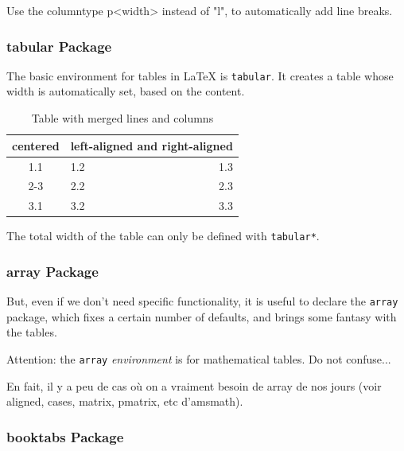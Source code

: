 \documentclass{boostreport}
\begin{document}
Use the columntype p{<width>} instead of "l", to automatically add line
breaks.

\subsubsection{tabular Package}
\label{sec:tabular-package}

The basic environment for tables in \LaTeX{} is \texttt{tabular}. It creates
a table whose width is automatically set, based on the content.

\begin{table}[!ht]
    \centering
    \begin{tabular}{| c | p{2cm} | r |}
        \hline
        centered     & \multicolumn{2}{c|}{left-aligned and right-aligned} \\
        \hline
        1.1          & 1.2                & 1.3                            \\
        \cline{2-3}  & 2.2                & 2.3                            \\
        \hline
        3.1          & 3.2                & 3.3                            \\
        \hline
    \end{tabular}
    \caption{Table with merged lines and columns}
    \label{tab:table}
\end{table}

The total width of the table can only be defined with \verb|tabular*|.

\subsubsection{array Package}
\label{sec:array-package}

But, even if we don't need specific functionality, it is useful to declare
the \texttt{array} package, which fixes a certain number of defaults, and
brings some fantasy with the tables.

\begin{boostnote}
    Attention: the \texttt{array} \emph{environment} is for mathematical
    tables. Do not confuse...

    En fait, il y a peu de cas où on a vraiment besoin de array de nos jours
    (voir aligned, cases, matrix, pmatrix, etc d'amsmath).
\end{boostnote}

\subsubsection{booktabs Package}
\label{sec:booktabs-package}
\end{document}
